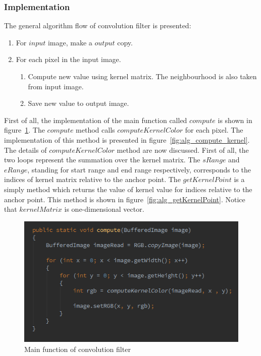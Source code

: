 \documentclass{article}
\begin{document}
\subsubsection{Implementation}

The general algorithm flow of convolution filter is presented:
 
\begin{enumerate}
	\item For $input$ image, make a $output$ copy.
	\item For each pixel in the input image.
	\begin{enumerate}	
		\item Compute new value using kernel matrix. The neighbourhood is also taken from input image.
		\item Save new value to output image.
	\end{enumerate}
\end{enumerate}


First of all, the implementation of the main function called $compute$ is shown in figure~\ref{fig:alg_compute}. The $compute$ method calls $computeKernelColor$ for each pixel. The implementation of this method is presented in figure~\ref{fig:alg_compute_kernel}. The details of $computeKernelColor$ method are now discussed. First of all, the two loops represent the summation over the kernel matrix. The $sRange$ and $eRange$, standing for start range and end range respectively, corresponds to the indices of kernel matrix relative to the anchor point. The $getKernelPoint$ is a simply method which returns the value of kernel value for indices relative to the anchor point. This method is shown in figure~\ref{fig:alg_getKernelPoint}. Notice that $kernelMatrix$ is one-dimensional vector.


%
% 
%
\begin{figure}[H]
\centering

  \includegraphics[width=0.9\linewidth]{res/algorithms/compute.png}
  
\caption{Main function of convolution filter}
\label{fig:alg_compute}
\end{figure}
\end{document}
